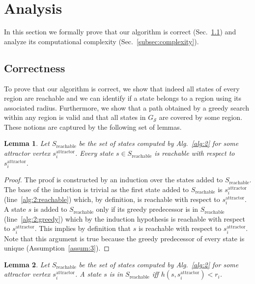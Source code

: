 \documentclass[letterpaper]{article} %
\newcommand{\calS}{\ensuremath{\mathcal{S}}\xspace}
\newcommand{\sAttract}{\ensuremath{s^{\text{attractor}}_i}\xspace}
\newtheorem{lemma}{Lemma}
\begin{document}
\section {Analysis}
\label{sec:analysis}
In this section we formally prove that 
our algorithm is correct (Sec.~\ref{subsec:correct}) and 
analyze its computational complexity (Sec.~\ref{subsec:complexity}).

\subsection{Correctness}
\label{subsec:correct}
To prove that our algorithm is correct, we show that indeed all states of every region are reachable and we can identify if a state belongs to a region using its associated radius.
Furthermore, we show that a path obtained by a greedy search within any region is valid and that all states in $G_\calS$ are covered by some region.
These notions are captured by the following set of lemmas.

\vspace{2mm}
\begin{lemma}
\label{lemma:reachable-1}
Let $S_{\text{reachable}}$ be the set of states computed by Alg.~\ref{alg:2} for some attractor vertex \sAttract.
%
Every state $s \in S_{\text{reachable}}$ is reachable with respect to \sAttract.
\end{lemma}
%
\begin{proof}
The proof is constructed by an induction over the states added to $S_{\text{reachable}}$.
The base of the induction is trivial as the first state added to $S_{\text{reachable}}$  is \sAttract (line~\ref{alg:2:reachable}) which, by definition, is reachable with respect to \sAttract.
%
A state $s$ is added to $S_{\text{reachable}}$ only if its greedy predecessor is in $S_{\text{reachable}}$ (line~\ref{alg:2:greedy}) which by the induction hypothesis is reachable with respect to \sAttract.
This implies by definition that $s$ is reachable with respect to \sAttract.
%
Note that this argument is true because the greedy predecessor of every state is unique (Assumption~\ref{assum:3}).
\end{proof}

\begin{lemma}
\label{lemma:reachable-2}
Let $S_{\text{reachable}}$ be the set of states computed by Alg.~\ref{alg:2} for some attractor vertex \sAttract.
%
A state $s$ is in $S_{\text{reachable}}$ iff $h(s, \sAttract) < r_i$.
\end{lemma}
\end{document}
